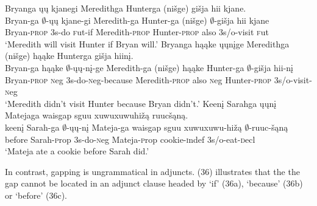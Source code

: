 \documentclass[output=paper]{LSP/langsci}
\begin{document}
\begin{exe}
\ex
\begin{xlist}
\ex
\glll Bryanga \k{u}\k{u} kjanegi Meredithga Hunterga (ni\v{s}ge) {gi\v{s}ja hii} kjane.\\
Bryan-ga $\emptyset$-\k{u}\k{u} kjane-gi Meredith-ga Hunter-ga (ni\v{s}ge) $\emptyset$-{gi\v{s}ja hii} kjane\\
Bryan-\textsc{prop} {\textsc 3s}-do {\textsc fut}-if Meredith-\textsc{prop} Hunter-\textsc{prop} also {\textsc 3s/o}-visit {\textsc fut}\\
\trans `Meredith will visit Hunter if Bryan will.'
\ex
\glll Bryanga h\k{a}\k{a}ke \k{u}\k{u}n\k{i}ge Meredithga (ni\v{s}ge) h\k{a}\k{a}ke Hunterga {gi\v{s}ja hiin\k{i}}.\\
Bryan-ga h\k{a}\k{a}ke $\emptyset$-\k{u}\k{u}-n\k{i}-ge Meredith-ga (ni\v{s}ge) h\k{a}\k{a}ke Hunter-ga $\emptyset$-{gi\v{s}ja hii-n\k{i}}\\
Bryan-\textsc{prop} {\textsc neg} {\textsc 3s}-do-{\textsc neg}-because Meredith-\textsc{prop} also {\textsc neg} Hunter-\textsc{prop} {\textsc 3s/o}-visit-{\textsc neg}\\
\trans `Meredith didn't visit Hunter because Bryan didn't.'
\ex
\glll Keen\k{i} Sarahga \k{u}\k{u}n\k{i} Matejaga {waisgap sguu xuwuxuwuhi\v{z}\k{a}} ruuc\v{s}\k{a}n\k{a}.\\
keen\k{i} Sarah-ga $\emptyset$-\k{u}\k{u}-n\k{i} Mateja-ga {waisgap sguu xuwuxuwu-hi\v{z}\k{a}} $\emptyset$-ruuc-\v{s}\k{a}n\k{a}\\
before Sarah-{\textsc prop} {\textsc 3s}-do-{\textsc neg} Mateja-{\textsc prop} cookie-{\textsc indef} {\textsc 3s/o}-eat-{\textsc decl}\\
\trans `Mateja ate a cookie before Sarah did.'
\end{xlist}
\end{exe}

In contrast, gapping is ungrammatical in adjuncts. (36) illustrates that the the gap cannot be located in an adjunct clause headed by `if' (36a), `because' (36b) or `before' (36c).
\end{document}
